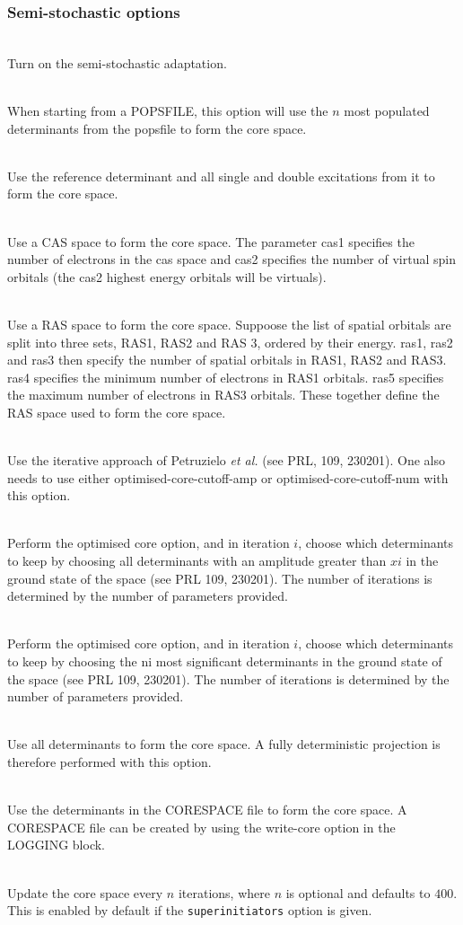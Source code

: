 \documentclass[a4paper,notitlepage]{scrreprt}
\newcommand\codeitem[1]{\needspace{1.5\baselineskip}\item[\textnormal{\ttfamily #1 \nopagebreak}] \hfill \\ \nopagebreak}
\begin{document}
  \subsubsection{Semi-stochastic options}
  \begin{description}
    \codeitem{\textcolor{oblue}{semi-stochastic}}
    Turn on the semi-stochastic adaptation.
    \codeitem{\textcolor{oblue}{pops-core $n$}}
    When starting from a POPSFILE, this option will use the $n$ most
    populated determinants from the popsfile to form the core space.    
    \codeitem{doubles-core}
    Use the reference determinant and all single and double excitations
    from it to form the core space.
    \codeitem{cas-core cas1 cas2}
    Use a CAS space to form the core space. The parameter cas1 specifies
    the number of electrons in the cas space and cas2 specifies the
    number of virtual spin orbitals (the cas2 highest energy orbitals
    will be virtuals).
    \codeitem{ras-core ras1 ras2 ras3 ras4 ras5}
    Use a RAS space to form the core space. Suppoose the list of spatial
    orbitals are split into three sets, RAS1, RAS2 and RAS 3, ordered
    by their energy. ras1, ras2 and ras3 then specify the number of
    spatial orbitals in RAS1, RAS2 and RAS3. ras4 specifies the minimum
    number of electrons in RAS1 orbitals. ras5 specifies the maximum
    number of electrons in RAS3 orbitals. These together define the RAS
    space used to form the core space.
    \codeitem{optimised-core}
    Use the iterative approach of Petruzielo \emph{et al.} (see PRL,
    109, 230201). One also needs to use either optimised-core-cutoff-amp
    or optimised-core-cutoff-num with this option.
    \codeitem{optimised-core-cutoff-amp $x1$, $x2$, $x3$...}
    Perform the optimised core option, and in iteration $i$, choose
    which determinants to keep by choosing all determinants with an
    amplitude greater than $xi$ in the ground state of the space (see
    PRL 109, 230201). The number of iterations is determined by the
    number of parameters provided.
    \codeitem{optimised-core-cutoff-num $n1$, $n2$, $n3$...}
    Perform the optimised core option, and in iteration $i$, choose
    which determinants to keep by choosing the ni most significant
    determinants in the ground state of the space (see PRL 109, 230201).
    The number of iterations is determined by the number of parameters
    provided.
    \codeitem{fci-core}
    Use all determinants to form the core space. A fully deterministic
    projection is therefore performed with this option.
    \codeitem{read-core}
    Use the determinants in the CORESPACE file to form the core space.
    A CORESPACE file can be created by using the write-core option in
    the LOGGING block.
    \codeitem{dynamic-core $n$}
    Update the core space every $n$ iterations, where $n$ is optional and
    defaults to $400$. This is enabled by default if the
    \texttt{superinitiators} option is given.    
    \end{description}
\end{document}
